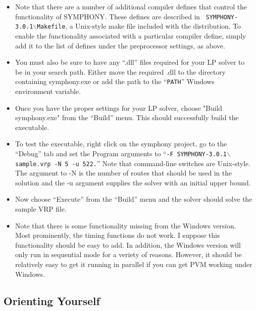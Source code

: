 \begin{itemize}
\begin{itemize}
\end{itemize}

\item Note that there are a number of additional compiler defines that control
the functionality of SYMPHONY. These defines are described in {\tt
SYMPHONY-3.0.1$\backslash$Makefile}, a Unix-style make file included with the
distribution. To enable the functionality associated with a particular
compiler define, simply add it to the list of defines under the preprocessor
settings, as above.

\item You must also be sure to have any ``.dll'' files required for your LP 
solver to be in your search path. Either move the required .dll to the
directory containing symphony.exe or add the path to the ``{\tt PATH}''
Windows environment variable.

\item Once you have the proper settings for your LP solver, choose "Build
symphony.exe" from the ``Build'' menu. This should successfully build the
executable.

\item To test the executable, right click on the symphony project, go to the
``Debug'' tab and set the Program arguments to ``{\tt -F
SYMPHONY-3.0.1$\backslash$sample.vrp -N 5 -u 522.}'' Note that command-line
switches are Unix-style. The argument to -N is the number of routes that
should be used in the solution and the -u argument supplies the solver with an
initial upper bound.

\item Now choose ``Execute'' from the ``Build'' menu and the solver should 
solve the sample VRP file.

\item Note that there is some functionality missing from the Windows
version. Most prominently, the timing functions do not work. I suppose this
functionality should be easy to add. In addition, the Windows
version will only run in sequential mode for a veriety of reasons. However, it
should be relatively easy to get it running in parallel if you can get PVM
working under Windows.

\end{itemize}

\subsection{Orienting Yourself}

